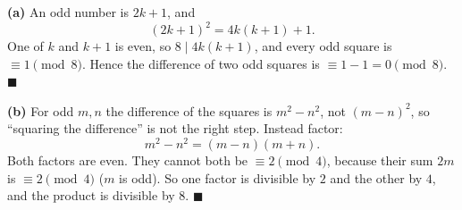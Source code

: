 \textbf{(a)} An odd number is $2k+1$, and
\[(2k+1)^2=4k(k+1)+1.\]
One of $k$ and $k+1$ is even, so $8\mid4k(k+1)$, and every odd square is $\equiv1\pmod8$. Hence the difference of two odd squares is $\equiv1-1=0\pmod8$. $\blacksquare$

\textbf{(b)} For odd $m,n$ the difference of the squares is $m^2-n^2$, not $(m-n)^2$, so ``squaring the difference'' is not the right step. Instead factor:
\[m^2-n^2=(m-n)(m+n).\]
Both factors are even. They cannot both be $\equiv2\pmod4$, because their sum $2m$ is $\equiv2\pmod4$ ($m$ is odd). So one factor is divisible by $2$ and the other by $4$, and the product is divisible by $8$. $\blacksquare$
